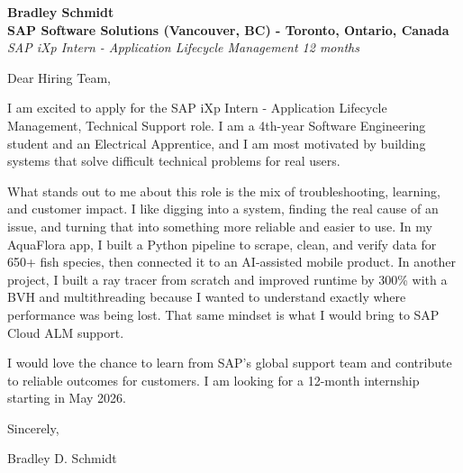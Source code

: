 \documentclass[11pt]{article}
\begin{document}
\textbf{Bradley Schmidt}\\
\vspace{0.5em}
\textbf{SAP Software Solutions (Vancouver, BC) - Toronto, Ontario, Canada}\\
\textit{SAP iXp Intern - Application Lifecycle Management 12 months}

Dear Hiring Team,

\par

I am excited to apply for the SAP iXp Intern - Application Lifecycle Management, Technical Support role. I am a 4th-year Software Engineering student and an Electrical Apprentice, and I am most motivated by building systems that solve difficult technical problems for real users.

\par

What stands out to me about this role is the mix of troubleshooting, learning, and customer impact. I like digging into a system, finding the real cause of an issue, and turning that into something more reliable and easier to use. In my AquaFlora app, I built a Python pipeline to scrape, clean, and verify data for 650+ fish species, then connected it to an AI-assisted mobile product. In another project, I built a ray tracer from scratch and improved runtime by 300\% with a BVH and multithreading because I wanted to understand exactly where performance was being lost. That same mindset is what I would bring to SAP Cloud ALM support.

\par

I would love the chance to learn from SAP's global support team and contribute to reliable outcomes for customers. I am looking for a 12-month internship starting in May 2026.

\par

Sincerely,

\par

Bradley D. Schmidt
\end{document}
